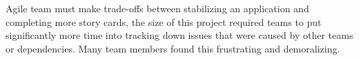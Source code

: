 \documentclass[preprint,authoryear,12pt]{elsarticle}
\begin{document}
Agile team must make trade-offs between stabilizing an application and
completing more story cards, the size of this project required teams to put
significantly more time into tracking down issues that were caused by other
teams or dependencies.   Many team members found this frustrating and
demoralizing.


% 
% 
% 
% 
% 
\end{document}
